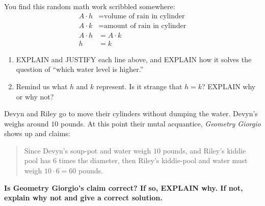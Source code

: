 \documentclass[nooutcomes,noauthor,hints]{ximera}
\begin{document}
\begin{question}
  You find this random math work scribbled somewhere:
  \begin{align}
    A \cdot h &= \text{volume of rain in cylinder}\\
    A \cdot k &= \text{amount of rain in cylinder}\\
    A\cdot h &= A\cdot k\\
    h &= k
  \end{align}
  \begin{enumerate}
  \item EXPLAIN and JUSTIFY each line above, and EXPLAIN how it solves
    the question of ``which water level is higher.''
  \item Remind us what $h$ and $k$ represent. Is it strange that
    $h=k$? EXPLAIN why or why not?
  \end{enumerate}
\end{question}
\mynewpage


\begin{question}
  Devyn and Riley go to move their cylinders without dumping the
  water. Devyn's weighs around $10$ pounds. At this point their mutal
  acquantice, \textit{Geometry Giorgio} shows up and claims:
  \begin{quote}
    Since Devyn's soup-pot and water weigh $10$ pounds, and Riley's
    kiddie pool has $6$ times the diameter, then Riley's kiddie-pool
    and water must weigh $10\cdot 6 = 60$ pounds.
  \end{quote}
  \textbf{Is Geometry Giorgio’s claim correct?  If so, EXPLAIN why. If
    not, explain why not and give a correct solution.}
\end{question}
\end{document}
